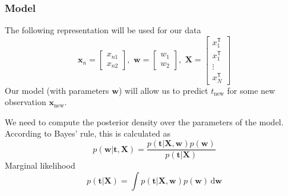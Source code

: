 \documentclass[english,10pt,aspectratio=169,fleqn]{beamer}
\begin{document}
\begin{frame} %
\frametitle{Model}

The following representation will be used for our data
\begin{equation*}
\mathbf{x}_{n} = \begin{bmatrix}
x_{n1} \\
x_{n2}
\end{bmatrix},\,\,
\mathbf{w} = \begin{bmatrix}
w_{1} \\
w_{2}
\end{bmatrix},\,\,
\mathbf{X} = \begin{bmatrix}
x_{1}^{\mathsf{T}} \\
x_{1}^{\mathsf{T}} \\
\vdots \\
x_{N}^{\mathsf{T}}
\end{bmatrix}
\end{equation*}
%
Our model (with parameters $\mathbf{w}$) will allow us to predict $t_{\mathrm{new}}$
for some new observation $\mathbf{x}_{\mathrm{new}}$.

We need to compute the posterior density over the parameters of the model.
According to Bayes' rule, this is calculated as
\begin{equation*}
p(\mathbf{w} | \mathbf{t}, \mathbf{X}) =
\frac{p(\mathbf{t}|\mathbf{X},\mathbf{w}) p(\mathbf{w})}%
{p(\mathbf{t}|\mathbf{X})}
\end{equation*}
%
Marginal likelihood
\begin{equation*}
p(\mathbf{t}|\mathbf{X}) = \int p(\mathbf{t} | \mathbf{X}, \mathbf{w})
p(\mathbf{w})\,\mathrm{d}\mathbf{w}
\end{equation*}

\end{frame}
\end{document}
